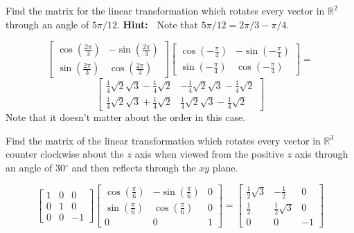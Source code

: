 \documentclass{ximera}
\begin{document}
\begin{problem}\label{prb:6.24} Find the matrix for the linear transformation which rotates every
vector in $\mathbb{R}^{2}$ through an angle of $5\pi /12.$ \textbf{Hint:\ }
Note that $5\pi /12=2\pi /3-\pi /4.$
\begin{hint}
\[
\left[
\begin{array}{cc}
\cos \left( \frac{2\pi }{3}\right) & -\sin \left( \frac{2\pi }{3}\right) \\
\sin \left( \frac{2\pi }{3}\right) & \cos \left( \frac{2\pi }{3}\right)
\end{array}
\right] \left[
\begin{array}{cc}
\cos \left( -\frac{\pi }{4}\right) & -\sin \left( -\frac{\pi }{4}\right) \\
\sin \left( -\frac{\pi }{4}\right) & \cos \left( -\frac{\pi }{4}\right)
\end{array}
\right] =
\]
\[
\left[
\begin{array}{cc}
\frac{1}{4}\sqrt{2}\sqrt{3}-\frac{1}{4}\sqrt{2} & -\frac{1}{4}\sqrt{2}\sqrt{3
}-\frac{1}{4}\sqrt{2} \\
\frac{1}{4}\sqrt{2}\sqrt{3}+\frac{1}{4}\sqrt{2} & \frac{1}{4}\sqrt{2}\sqrt{3}
-\frac{1}{4}\sqrt{2}
\end{array}
\right]
\]
Note that it doesn't matter about the order in this case.
\end{hint}
\end{problem}

\begin{problem}\label{prb:6.25} Find the matrix of the linear transformation which rotates every
vector in $\mathbb{R}^{3}$ counter clockwise about the $z$ axis when viewed
from the positive $z$ axis through an angle of 30$^{\circ }$ and then
reflects through the $xy$ plane.
\begin{hint}
\[
\left[
\begin{array}{rrr}
1 & 0 & 0 \\
0 & 1 & 0 \\
0 & 0 & -1
\end{array}
\right] \left[
\begin{array}{ccc}
\cos \left( \frac{\pi }{6}\right)  & -\sin \left( \frac{\pi }{6}\right)  & 0
\\
\sin \left( \frac{\pi }{6}\right)  & \cos \left( \frac{\pi }{6}\right)  & 0
\\
0 & 0 & 1
\end{array}
\right] = \left[
\begin{array}{ccc}
\frac{1}{2}\sqrt{3} & -\frac{1}{2} & 0 \\
\frac{1}{2} & \frac{1}{2}\sqrt{3} & 0 \\
0 & 0 & -1
\end{array}
\right]
\]
\end{hint}
\end{problem}
\end{document}
